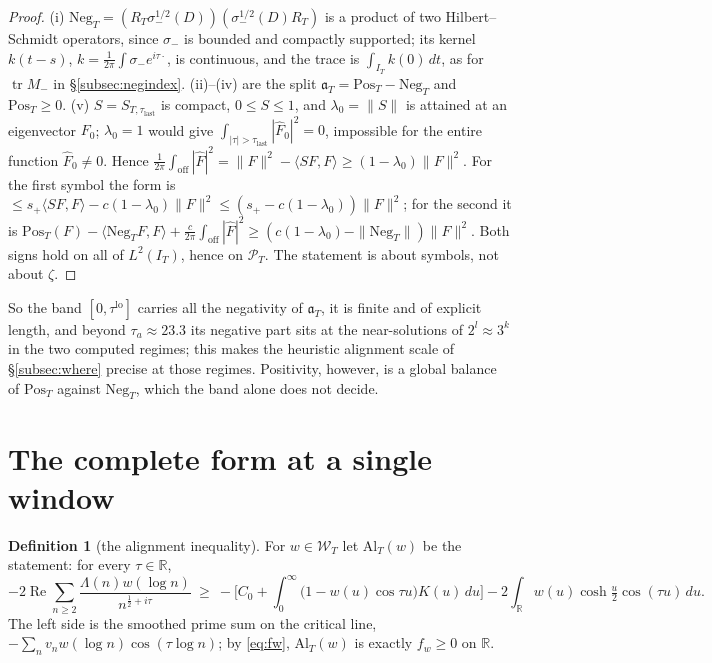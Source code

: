 \documentclass[11pt]{amsart}
\theoremstyle{definition}
\newtheorem{definition}[theorem]{Definition}
\theoremstyle{remark}
\newcommand{\R}{\mathbb R}
\newcommand{\Rel}{\operatorname{Re}}
\newcommand{\PT}{\mathcal P_T}
\newcommand{\IT}{I_T}
\newcommand{\Fh}{\widehat F}
\newcommand{\Wcl}{\mathcal W_T}
\begin{document}
\begin{proof}
(i) $\mathrm{Neg}_T=(R_T\sigma_-^{1/2}(D))(\sigma_-^{1/2}(D)R_T)$ is a product of two Hilbert--Schmidt operators,
since $\sigma_-$ is bounded and compactly supported; its kernel $k(t-s)$, $k=\frac1{2\pi}\int\sigma_-e^{i\tau\cdot}$, is
continuous, and the trace is $\int_{\IT}k(0)\,dt$, as for $\operatorname{tr}M_-$ in \S\ref{subsec:negindex}.
(ii)--(iv) are the split $\mathfrak a_T=\mathrm{Pos}_T-\mathrm{Neg}_T$ and $\mathrm{Pos}_T\ge0$.
(v) $S=S_{T,\tau_{\mathrm{last}}}$ is compact, $0\le S\le1$, and $\lambda_0=\|S\|$ is attained at an eigenvector
$F_0$; $\lambda_0=1$ would give $\int_{|\tau|>\tau_{\mathrm{last}}}|\Fh_0|^2=0$, impossible for the entire
function $\Fh_0\ne0$. Hence $\frac1{2\pi}\int_{\mathrm{off}}|\Fh|^2=\|F\|^2-\langle SF,F\rangle\ge(1-\lambda_0)\|F\|^2$. For the
first symbol the form is $\le s_+\langle SF,F\rangle-c(1-\lambda_0)\|F\|^2\le(s_+-c(1-\lambda_0))\|F\|^2$; for the second
it is $\mathrm{Pos}_T(F)-\langle\mathrm{Neg}_TF,F\rangle+\frac c{2\pi}\int_{\mathrm{off}}|\Fh|^2\ge(c(1-\lambda_0)-\|\mathrm{Neg}_T\|)\|F\|^2$.
Both signs hold on all of $L^2(\IT)$, hence on $\PT$. The statement is about symbols, not about $\zeta$.
\end{proof}

So the band $[0,\tau^{\mathrm{lo}}]$ carries all the negativity of $\mathfrak a_T$, it is finite and of
explicit length, and beyond $\tau_a\approx23.3$ its negative part sits at the near-solutions of
$2^l\approx3^k$ in the two computed regimes; this makes the heuristic alignment scale of
\S\ref{subsec:where} precise at those regimes. Positivity, however, is a global balance of $\mathrm{Pos}_T$
against $\mathrm{Neg}_T$, which the band alone does not decide.

\section{The complete form at a single window}\label{subsec:alignineq}

\begin{definition}[the alignment inequality]\label{def:Al}
For $w\in\Wcl$ let $\mathrm{Al}_T(w)$ be the statement: for every $\tau\in\R$,
\[
-2\Rel\sum_{n\ge2}\frac{\Lambda(n)w(\log n)}{n^{\frac12+i\tau}}\ \ge\
-\Big[C_0+\int_0^\infty\big(1-w(u)\cos\tau u\big)K(u)\,du\Big]-2\int_\R w(u)\cosh\tfrac u2\cos(\tau u)\,du .
\]
The left side is the smoothed prime sum on the critical line, $-\sum_nv_nw(\log n)\cos(\tau\log n)$; by
\eqref{eq:fw}, $\mathrm{Al}_T(w)$ is exactly $f_w\ge0$ on $\R$.
\end{definition}
\end{document}

